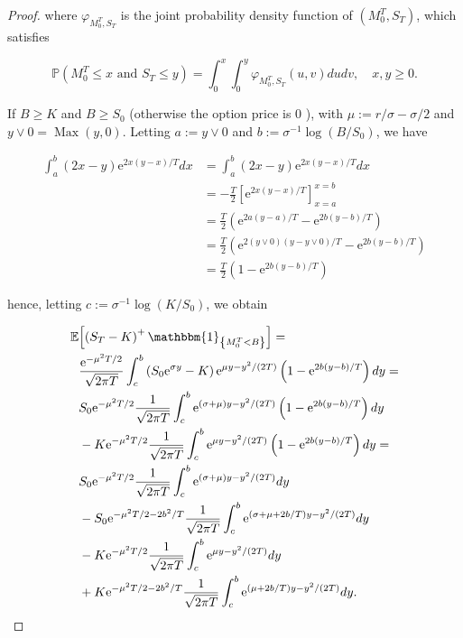\begin{appendices}
\begin{proof}
where $\varphi_{M_{0}^{T}, S_{T}}$ is the joint probability density function of $\left(M_{0}^{T}, S_{T}\right)$, which satisfies

$$
\mathbb{P}\left(M_{0}^{T} \leq x \text { and } S_{T} \leq y\right)=\int_{0}^{x} \int_{0}^{y} \varphi_{M_{0}^{T}, S_{T}}(u, v) d u d v, \quad x, y \geq 0 .
$$

If $B \geq K$ and $B \geq S_{0}$ (otherwise the option price is 0 ), with $\mu:=r / \sigma-\sigma / 2$ and $y \vee 0=\operatorname{Max}(y, 0)$. Letting $a:=y \vee 0$ and $b:=\sigma^{-1} \log \left(B / S_{0}\right)$, we have

$$
\begin{aligned}
\int_{a}^{b}(2 x-y) \mathrm{e}^{2 x(y-x) / T} d x & =\int_{a}^{b}(2 x-y) \mathrm{e}^{2 x(y-x) / T} d x \\
& =-\frac{T}{2}\left[\mathrm{e}^{2 x(y-x) / T}\right]_{x=a}^{x=b} \\
& =\frac{T}{2}\left(\mathrm{e}^{2 a(y-a) / T}-\mathrm{e}^{2 b(y-b) / T}\right) \\
& =\frac{T}{2}\left(\mathrm{e}^{2(y \vee 0)(y-y \vee 0) / T}-\mathrm{e}^{2 b(y-b) / T}\right) \\
& =\frac{T}{2}\left(1-\mathrm{e}^{2 b(y-b) / T}\right)
\end{aligned}
$$

hence, letting $c:=\sigma^{-1} \log \left(K / S_{0}\right)$, we obtain

$$
\begin{aligned}
\mathbb{E} & {\left[\left(S_{T}-K\right)^{+} \mathbbm{1}_{\left\{M_{0}^{T}<B\right\}}\right] } = \\
& \frac{\mathrm{e}^{-\mu^{2} T / 2}}{\sqrt{2 \pi T}} \int_{c}^{b}\left(S_{0} \mathrm{e}^{\sigma y}-K\right) \mathrm{e}^{\mu y-y^{2} /(2 T)}\left(1-\mathrm{e}^{2 b(y-b) / T}\right) d y = \\
& S_{0} \mathrm{e}^{-\mu^{2} T / 2} \frac{1}{\sqrt{2 \pi T}} \int_{c}^{b} \mathrm{e}^{(\sigma+\mu) y-y^{2} /(2 T)}\left(1-\mathrm{e}^{2 b(y-b) / T}\right) d y \\
& -K \mathrm{e}^{-\mu^{2} T / 2} \frac{1}{\sqrt{2 \pi T}} \int_{c}^{b} \mathrm{e}^{\mu y-y^{2} /(2 T)}\left(1-\mathrm{e}^{2 b(y-b) / T}\right) d y = \\
& S_{0} \mathrm{e}^{-\mu^{2} T / 2} \frac{1}{\sqrt{2 \pi T}} \int_{c}^{b} \mathrm{e}^{(\sigma+\mu) y-y^{2} /(2 T)} d y \\
& -S_{0} \mathrm{e}^{-\mu^{2} T / 2-2 b^{2} / T} \frac{1}{\sqrt{2 \pi T}} \int_{c}^{b} \mathrm{e}^{(\sigma+\mu+2 b / T) y-y^{2} /(2 T)} d y \\
& -K \mathrm{e}^{-\mu^{2} T / 2} \frac{1}{\sqrt{2 \pi T}} \int_{c}^{b} \mathrm{e}^{\mu y-y^{2} /(2 T)} d y \\
& +K \mathrm{e}^{-\mu^{2} T / 2-2 b^{2} / T} \frac{1}{\sqrt{2 \pi T}} \int_{c}^{b} \mathrm{e}^{(\mu+2 b / T) y-y^{2} /(2 T)} d y .
\end{aligned}
$$


\end{proof}
\end{appendices}
